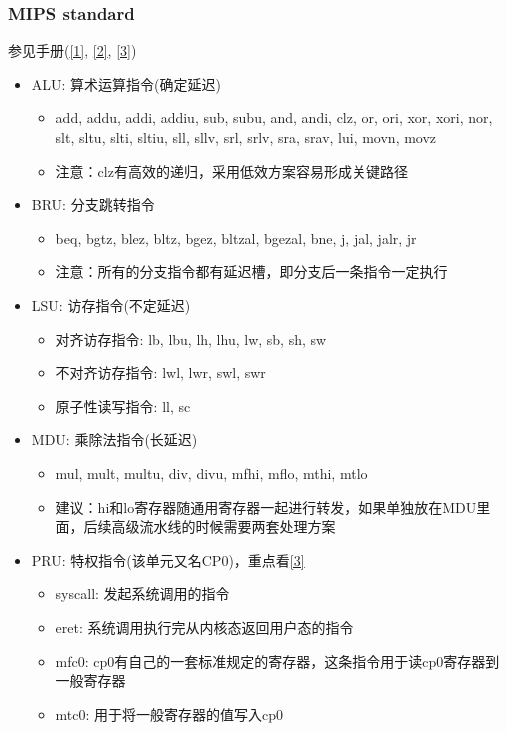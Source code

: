 \documentclass[lang=cn,11pt,a4paper]{elegantpaper}
\begin{document}
\subsubsection{MIPS standard}
参见手册(\href{../manuals/MIPS_Vol1.pdf}{[1]}, \href{../manuals/MIPS_Vol2.pdf}{[2]}, \href{../manuals/MIPS_Vol3.pdf}{[3]})
\begin{itemize}
\item ALU: 算术运算指令(确定延迟)
  \begin{itemize}
  \item add, addu, addi, addiu, sub, subu, and, andi, clz, or, ori, xor, xori, nor, slt, sltu, slti, sltiu, sll, sllv, srl, srlv, sra, srav, lui, movn, movz
  \item 注意：clz有高效的递归，采用低效方案容易形成关键路径
  \end{itemize}
\item BRU: 分支跳转指令
  \begin{itemize}
  \item beq, bgtz, blez, bltz, bgez, bltzal, bgezal, bne, j, jal, jalr, jr
  \item 注意：所有的分支指令都有延迟槽，即分支后一条指令一定执行
  \end{itemize}
\item LSU: 访存指令(不定延迟)
  \begin{itemize}
  \item 对齐访存指令: lb, lbu, lh, lhu, lw, sb, sh, sw
  \item 不对齐访存指令: lwl, lwr, swl, swr
  \item 原子性读写指令: ll, sc
  \end{itemize}
\item MDU: 乘除法指令(长延迟)
  \begin{itemize}
  \item mul, mult, multu, div, divu, mfhi, mflo, mthi, mtlo
  \item 建议：hi和lo寄存器随通用寄存器一起进行转发，如果单独放在MDU里面，后续高级流水线的时候需要两套处理方案
  \end{itemize}
\item PRU: 特权指令(该单元又名CP0)，重点看\href{../manuals/MIPS_Vol3.pdf}{[3]}
  \begin{itemize}
  \item syscall: 发起系统调用的指令
  \item eret: 系统调用执行完从内核态返回用户态的指令
  \item mfc0: cp0有自己的一套标准规定的寄存器，这条指令用于读cp0寄存器到一般寄存器
  \item mtc0: 用于将一般寄存器的值写入cp0

\end{itemize}
\end{itemize}
\end{document}
